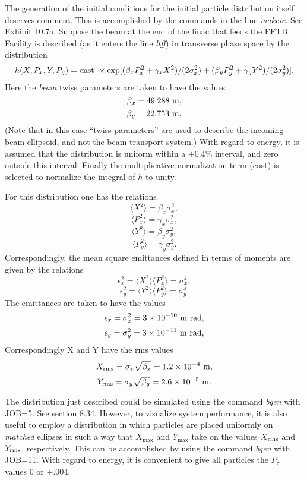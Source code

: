 The generation of the initial conditions for the initial particle
distribution itself deserves comment.  This is accomplished by the
commands in the line {\em makeic}.  See Exhibit 10.7a.  Suppose the beam
at the end of the linac that feeds the FFTB Facility is described (as it
enters the line {\em ltff}) in transverse phase space by the distribution
\begin{equation}
h(X,P_x,Y,P_y) = {\rm cnst} \ \times \exp [(\beta_x P^2_x + \gamma_x
X^2)/(2\sigma^2_x) + (\beta_y P^2_y + \gamma_y Y^2)/(2\sigma^2_y)].
\end{equation}
Here the {\em beam} twiss parameters are taken to have the values
\[
\beta_x = 49.288 \ {\rm m},
\]
\begin{equation}
\beta_y = 22.753 \ {\rm m}.
\end{equation}
(Note that in this case ``twiss parameters'' are used to describe the
incoming beam ellipsoid, and not the beam transport system.)  With regard
to energy, it is assumed that the distribution is uniform within a $\pm
0.4\%$ interval, and zero outside this interval.  Finally the
multiplicative normalization term (cnst) is selected to normalize the
integral of $h$ to unity.

For this distribution one has the relations
\[
\langle X^2\rangle = \beta_x\sigma^2_x,
\]
\[
\langle P_x^2\rangle = \gamma_x\sigma^2_x,
\]
\[
\langle Y^2\rangle = \beta_y\sigma^2_y,
\]
\begin{equation}
\langle P_y^2\rangle = \gamma_y\sigma^2_y.
\end{equation}
Correspondingly, the mean square emittances defined in terms of moments
are given by the relations
\[
\epsilon_x^2 = \langle X^2\rangle\langle P^2_x\rangle = \sigma^4_x,
\]
\begin{equation}
\epsilon_y^2 = \langle Y^2\rangle\langle P^2_y\rangle = \sigma^4_y.
\end{equation}
The emittances are taken to have the values
\[
\epsilon_x = \sigma^2_x = 3 \times 10^{-10} \ {\rm m \ rad},
\]
\begin{equation}
\epsilon_y = \sigma^2_y = 3 \times 10^{-11} \ {\rm m \ rad},
\end{equation}
Correspondingly X and Y have the rms values
\[
X_{\rm rms} = \sigma_x \sqrt{\beta_x} = 1.2 \times 10^{-4} \ {\rm m},
\]
\begin{equation}
Y_{\rm rms} = \sigma_y \sqrt{\beta_y} = 2.6 \times 10^{-5} \ {\rm m}.
\end{equation}

The distribution just described could be simulated using the command {\em
bgen} with JOB=5.  See section 8.34.  However, to visualize system
performance, it is also useful to employ a distribution in which
particles are placed uniformly on {\em matched} ellipses in such a way
that $X_{\max}$ and $Y_{\max}$ take on the values $X_{\rm rms}$ and
$Y_{\rm rms}$, respectively.  This can be accomplished by using the command
{\em bgen} with JOB=11.  With regard to energy, it is convenient to give
all particles the $P_{\tau}$ values 0 or $\pm .004$.   

